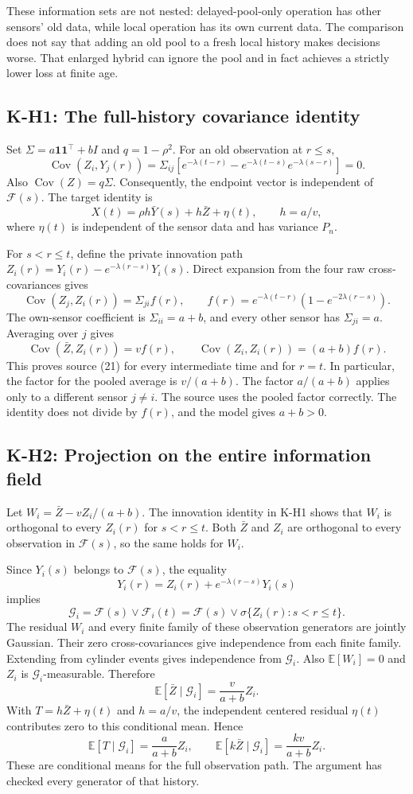 \documentclass[11pt,letterpaper]{article}
\newcommand{\E}{\mathbb E}
\newcommand{\Cov}{\operatorname{Cov}}
\newcommand{\one}{\mathbf1}
\newcommand{\G}{\mathcal G}
\newcommand{\F}{\mathcal F}
\newcommand{\calculation}[2]{\subsection{#1: #2}}
\begin{document}
These information sets are not nested: delayed-pool-only operation has other sensors' old data, while local operation has its own current data. The comparison does not say that adding an old pool to a fresh local history makes decisions worse. That enlarged hybrid can ignore the pool and in fact achieves a strictly lower loss at finite age.

\calculation{K-H1}{The full-history covariance identity}
Set $\Sigma=a\one\one^\top+bI$ and $q=1-\rho^2$. For an old observation at $r\le s$,
\[
\Cov(Z_i,Y_j(r))
=\Sigma_{ij}\left[e^{-\lambda(t-r)}-
e^{-\lambda(t-s)}e^{-\lambda(s-r)}\right]=0.
\]
Also $\Cov(Z)=q\Sigma$. Consequently, the endpoint vector is independent of $\F(s)$. The target identity is
\[
X(t)=\rho h\bar Y(s)+h\bar Z+\eta(t),\qquad h=a/v,
\]
where $\eta(t)$ is independent of the sensor data and has variance $P_n$.

For $s<r\le t$, define the private innovation path $Z_i(r)=Y_i(r)-e^{-\lambda(r-s)}Y_i(s)$. Direct expansion from the four raw cross-covariances gives
\[
\Cov(Z_j,Z_i(r))=\Sigma_{ji}f(r),\qquad
f(r)=e^{-\lambda(t-r)}(1-e^{-2\lambda(r-s)}).
\]
The own-sensor coefficient is $\Sigma_{ii}=a+b$, and every other sensor has $\Sigma_{ji}=a$. Averaging over $j$ gives
\[
\Cov(\bar Z,Z_i(r))=v f(r),\qquad
\Cov(Z_i,Z_i(r))=(a+b)f(r).
\]
This proves source (21) for every intermediate time and for $r=t$. In particular, the factor for the pooled average is $v/(a+b)$. The factor $a/(a+b)$ applies only to a different sensor $j\ne i$. The source uses the pooled factor correctly. The identity does not divide by $f(r)$, and the model gives $a+b>0$.

\calculation{K-H2}{Projection on the entire information field}
Let $W_i=\bar Z-vZ_i/(a+b)$. The innovation identity in K-H1 shows that $W_i$ is orthogonal to every $Z_i(r)$ for $s<r\le t$. Both $\bar Z$ and $Z_i$ are orthogonal to every observation in $\F(s)$, so the same holds for $W_i$.

Since $Y_i(s)$ belongs to $\F(s)$, the equality
\[
Y_i(r)=Z_i(r)+e^{-\lambda(r-s)}Y_i(s)
\]
implies
\[
\G_i=\F(s)\vee\F_i(t)
=\F(s)\vee\sigma\{Z_i(r):s<r\le t\}.
\]
The residual $W_i$ and every finite family of these observation generators are jointly Gaussian. Their zero cross-covariances give independence from each finite family. Extending from cylinder events gives independence from $\G_i$. Also $\E[W_i]=0$ and $Z_i$ is $\G_i$-measurable. Therefore
\[
\E[\bar Z\mid\G_i]=\frac{v}{a+b}Z_i.
\tag{A3}
\]
With $T=h\bar Z+\eta(t)$ and $h=a/v$, the independent centered residual $\eta(t)$ contributes zero to this conditional mean. Hence
\[
\E[T\mid\G_i]=\frac{a}{a+b}Z_i,\qquad
\E[k\bar Z\mid\G_i]=\frac{kv}{a+b}Z_i.
\]
These are conditional means for the full observation path. The argument has checked every generator of that history.
\end{document}
